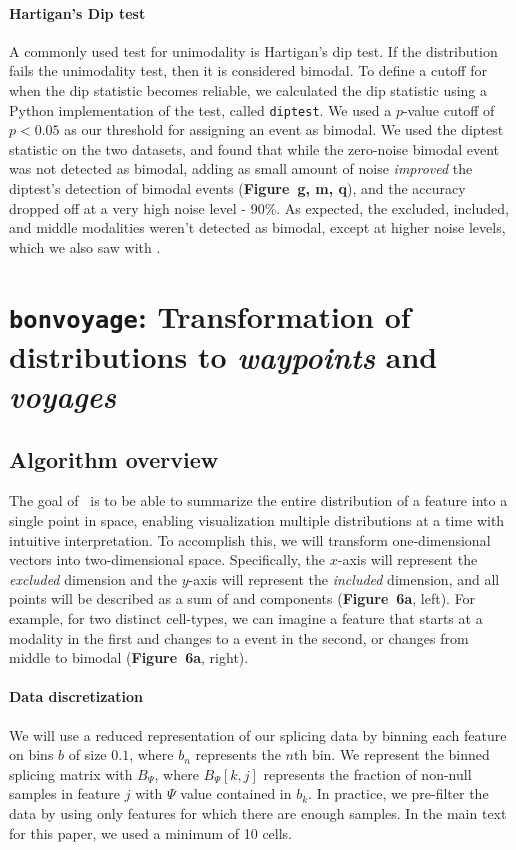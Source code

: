 \paragraph{Hartigan's Dip test}
A commonly used test for unimodality is Hartigan's dip test\cite{Hartigan:1985ca}. If the distribution fails the unimodality test, then it is considered bimodal. To define a cutoff for when the dip statistic becomes reliable, we calculated the dip statistic using a Python implementation of the test, called \texttt{diptest}\cite{Anonymous:zTNIPlgQ}. We used a $p$-value cutoff of $p <0.05$ as our threshold for assigning an event as bimodal. We used the diptest statistic on the two datasets, and found that while the zero-noise bimodal event was not detected as bimodal, adding as small amount of noise \emph{improved} the diptest's detection of bimodal events (\textbf{Figure~g, m, q}), and the accuracy dropped off at a very high noise level - 90\%. As expected, the excluded, included, and middle modalities weren't detected as bimodal, except at higher noise levels, which we also saw with \anchor.


\section{\texttt{bonvoyage}: Transformation of distributions to \emph{waypoints} and \emph{voyages}}
\label{sec:bonvoyage}

\subsection{Algorithm overview}

The goal of \bonvoyage\, is to be able to summarize the entire distribution of a feature into a single point in space, enabling visualization multiple distributions at a time with intuitive interpretation. To accomplish this, we will transform one-dimensional vectors into two-dimensional space. Specifically, the $x$-axis will represent the \emph{excluded} dimension and the $y$-axis will represent the \emph{included} dimension, and all points will be described as a sum of \0 and \1 components (\textbf{Figure~6a}, left). For example, for two distinct cell-types, we can imagine a feature that starts at a \1 modality in the first and changes to a \0 event in the second, or changes from middle to bimodal (\textbf{Figure~6a}, right).



\paragraph{Data discretization}
We will use a reduced representation of our splicing data by binning each feature on bins $b$ of size $0.1$, where $b_n$ represents the $n$th bin. We represent the binned splicing matrix with $B_\Psi$, where $B_\Psi[k,j]$ represents the fraction of non-null samples in feature $j$ with $\Psi$ value contained in $b_k$. In practice, we pre-filter the data by using only features for which there are enough samples. In the main text for this paper, we used a minimum of 10 cells.

